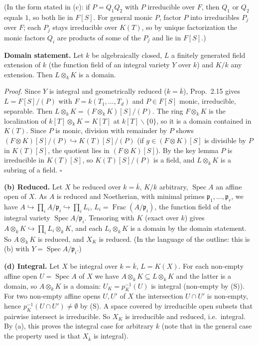 \documentclass[11pt]{article}
\begin{document}
(In the form stated in (c): if $P=Q_1Q_2$ with $P$ irreducible over $F$, then $Q_1$ or $Q_2$ equals $1$, so both lie in $F[S]$. For general monic $P$, factor $P$ into irreducibles $P_j$ over $F$; each $P_j$ stays irreducible over $K(T)$, so by unique factorization the monic factors $Q_i$ are products of some of the $P_j$ and lie in $F[S]$.)

\textbf{Domain statement.} Let $k$ be algebraically closed, $L$ a finitely generated field extension of $k$ (the function field of an integral variety $Y$ over $k$) and $K/k$ any extension. Then $L\otimes_kK$ is a domain.

\emph{Proof.} Since $Y$ is integral and geometrically reduced ($k=\overline k$), Prop.~2.15 gives $L=F[S]/(P)$ with $F=k(T_1,\dots,T_d)$ and $P\in F[S]$ monic, irreducible, separable. Then $L\otimes_kK=(F\otimes_kK)[S]/(P)$. The ring $F\otimes_kK$ is the localization of $k[T]\otimes_kK=K[T]$ at $k[T]\smallsetminus\{0\}$, so it is a domain contained in $K(T)$. Since $P$ is monic, division with remainder by $P$ shows $(F\otimes K)[S]/(P)\hookrightarrow K(T)[S]/(P)$ (if $g\in(F\otimes K)[S]$ is divisible by $P$ in $K(T)[S]$, the quotient lies in $(F\otimes K)[S]$). By the key lemma $P$ is irreducible in $K(T)[S]$, so $K(T)[S]/(P)$ is a field, and $L\otimes_kK$ is a subring of a field. $\square$

\textbf{(b) Reduced.} Let $X$ be reduced over $k=\overline k$, $K/k$ arbitrary, $\operatorname{Spec}A$ an affine open of $X$. As $A$ is reduced and Noetherian, with minimal primes $\mathfrak p_1,\dots,\mathfrak p_r$, we have $A\hookrightarrow\prod_iA/\mathfrak p_i\hookrightarrow\prod_iL_i$, $L_i=\operatorname{Frac}(A/\mathfrak p_i)$, the function field of the integral variety $\operatorname{Spec}A/\mathfrak p_i$. Tensoring with $K$ (exact over $k$) gives $A\otimes_kK\hookrightarrow\prod_iL_i\otimes_kK$, and each $L_i\otimes_kK$ is a domain by the domain statement. So $A\otimes_kK$ is reduced, and $X_K$ is reduced. (In the language of the outline: this is (b) with $Y=\operatorname{Spec}A/\mathfrak p_i$.)

\textbf{(d) Integral.} Let $X$ be integral over $k=\overline k$, $L=K(X)$. For each non-empty affine open $U=\operatorname{Spec}A$ of $X$ we have $A\otimes_kK\subseteq L\otimes_kK$ and the latter is a domain, so $A\otimes_kK$ is a domain: $U_K=p_K^{-1}(U)$ is integral (non-empty by (S)). For two non-empty affine opens $U,U'$ of $X$ the intersection $U\cap U'$ is non-empty, hence $p_K^{-1}(U\cap U')\neq\emptyset$ by (S). A space covered by irreducible open subsets that pairwise intersect is irreducible. So $X_K$ is irreducible and reduced, i.e.\ integral. By (a), this proves the integral case for arbitrary $k$ (note that in the general case the property used is that $X_{\overline k}$ is integral).
\end{document}
